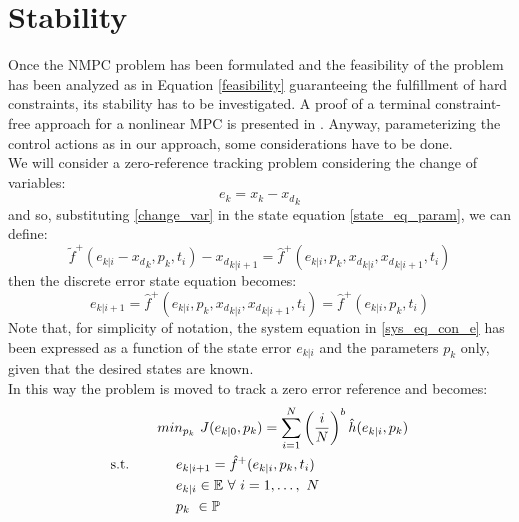 \documentclass[12pt]{article}
\begin{document}
\newcommand{\fix}[1]{\textcolor{red}{FIX: #1} }   

\section*{Stability}

Once the NMPC problem has been formulated and the feasibility of the problem has been analyzed as in Equation \ref{feasibility} guaranteeing the fulfillment of hard  constraints, its stability has to be investigated. A proof of a terminal constraint-free approach for a nonlinear MPC is presented in \cite{alamir2018stability}. Anyway, parameterizing the control actions as in our approach, some considerations have to be done. \\
We will consider a zero-reference tracking problem considering the change of variables:
\begin{equation}\label{change_var}
    e_k=x_k-{x_d}_k
\end{equation}
and so, substituting \ref{change_var} in the state equation \ref{state_eq_param}, we can define:
\begin{equation} \label{NLsystem}
	\tilde{f}^+(e_{k|i}-{x_d}_k,p_k,t_i)-{x_d}_{k|i+1}=\hat{f}^+(e_{k|i},p_k,{{x_d}_{k|i}},{{x_d}_{k|i+1}},t_i) 
\end{equation}
then the discrete error state equation becomes:
\begin{equation}\label{sys_eq_con_e}
    e_{k|i+1}=\hat{f}^+(e_{k|i},p_k,{{x_d}_{k|i}},{{x_d}_{k|i+1}},t_i)=\hat{f}^+(e_{k|i},p_k,t_i)
\end{equation}
Note that, for simplicity of notation, the system equation in \ref{sys_eq_con_e} has been expressed as a function of the state error ${e_{k|i}}$ and the parameters $p_k$ only, given that the desired states are known.\\
In this way the problem is moved to track a zero error reference and becomes: 
\begin{equation} \label{ourproblem_stab}
\begin{split}
		& min_{{p}_k}\ J({e}_{k|0},{p}_k) =\sum_{i=1}^{N}\left(\frac{i}{N}\right)^b\hat{h}(e_{k|i},{p}_{k}) \\
		\textnormal{s.t.}\qquad
		&\ \ \ \ e_{k|i+1}=\hat{f}^+(e_{k|i},p_k,t_i) \\
		&\ \ \ \ e_{k|i} \in \mathbb{E}\ \forall\ i=1,\dots,\ N  \\
		&\ \ \ \ {p}_k\   \in \mathbb{P}\ \\
	\end{split}	
\end{equation}
\end{document}
